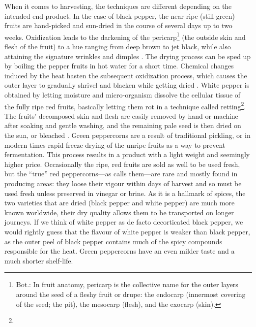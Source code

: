 When it comes to harvesting, the techniques are different depending on the intended end product. In the case of black pepper, the near-ripe (still green) fruits are hand-picked and sun-dried in the course of several days up to two weeks. Oxidization leads to the darkening of the pericarp\footnote{Bot.: In fruit anatomy, pericarp is the collective name for the outer layers around the seed of a fleshy fruit or drupe: the endocarp (innermost covering of the seed; the pit), the mesocarp (flesh), and the exocarp (skin).} (the outside skin and flesh of the fruit) to a hue ranging from deep brown to jet black, while also attaining the signature wrinkles and dimples \autocite[254]{hill_contemporary_2004}. The drying process can be sped up by boiling the pepper fruits in hot water for a short time. Chemical changes induced by the heat hasten the subsequent oxidization process, which causes the outer layer to gradually shrivel and blacken while getting dried \autocite[216]{van_wyk_culinary_2014}. White pepper is obtained by letting moisture and micro-organism dissolve the cellular tissue of the fully ripe red fruits, basically letting them rot in a technique called retting\footnote{}. The fruits' decomposed skin and flesh are easily removed by hand or machine after soaking and gentle washing, and the remaining pale seed is then dried on the sun, or bleached \autocite[216]{van_wyk_culinary_2014}. Green peppercorns are a result of traditional pickling, or in modern times rapid freeze-drying of the unripe fruits as a way to prevent fermentation. This process results in a product with a light weight and seemingly higher price. Occasionally the ripe, red fruits are sold as well to be used fresh, but the ``true'' red peppercorns---as \textcite{hill_contemporary_2004} calls them---are rare and mostly found in producing areas: they loose their vigour within days of harvest and so must be used fresh unless preserved in vinegar or brine. As it is a hallmark of spices, the two varieties that are dried (black pepper and white pepper) are much more known worldwide, their dry quality allows them to be transported on longer journeys. If we think of white pepper as de facto decorticated black pepper, we would rightly guess that the flavour of white pepper is weaker than black pepper, as the outer peel of black pepper contains much of the spicy compounds responsible for the heat. Green peppercorns have an even milder taste and a much shorter shelf-life.
